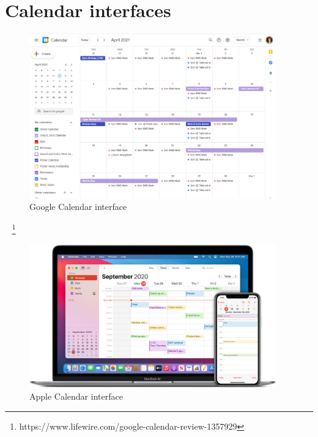 \makeatletter
{}
\makeatother


\chapter{Calendar interfaces} \label{a:calendars}

    \begin{figure}[ht]
        \centering
             \includegraphics[width=0.95\textwidth]{figures/image14.png}
        \caption{Google Calendar interface} 
        \label{a:fig:gcalendar}
    \end{figure}
    
~
\footnote{https://www.lifewire.com/google-calendar-review-1357929}
\clearpage
        \begin{figure}[ht]
        \centering
             \includegraphics[width=0.95\textwidth]{figures/image6.jpg}
        \caption{Apple Calendar interface} 
        \label{a:fig:applecalendar}
    \end{figure}
    
